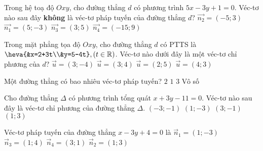 \begin{ex}%
	Trong hệ toạ độ $Oxy$, cho đường thẳng $d$ có phương trình $5x-3y+1=0$. Véc-tơ nào sau đây \textbf{không} là véc-tơ pháp tuyến của đường thẳng $d$?
	\choice
	{$\overrightarrow{n_2}=(-5;3)$}
	{$\overrightarrow{n_1}=(5;-3)$}
	{\True $\overrightarrow{n_3}=(3;5)$}
	{$\overrightarrow{n_4}=(-15;9)$}
\end{ex}


\begin{ex}%
	Trong mặt phẳng tọa độ $Oxy$, cho đường thẳng $d$ có PTTS là $\heva{&x=2+3t\\&y=5-4t},(t\in\mathbb{R})$. Véc-tơ nào dưới đây là một véc-tơ chỉ phương của $d$?
	\choice
	{\True $\overrightarrow{u}=(3;-4)$}
	{$\overrightarrow{u}=(3;4)$}
	{$\overrightarrow{u}=(2;5)$}
	{$\overrightarrow{u}=(4;3)$}
\end{ex}


\begin{ex}%
	Một đường thẳng có bao nhiêu véc-tơ pháp tuyến?
	\choice
	{$ 2 $}
	{$ 1 $}
	{$ 3 $}
	{\True Vô số}
\end{ex}


\begin{ex}%
	Cho đường thẳng $\Delta$ có phương trình tổng quát $x+3y-11=0$. Véc-tơ nào sau đây là véc-tơ chỉ phương của đường thẳng $\Delta$.
	\choice
	{$(-3;-1)$}
	{$(1;-3)$}
	{\True $(3;-1)$}
	{$(1;3)$}
\end{ex}


\begin{ex}%
	Véc-tơ pháp tuyến của đường thẳng $x-3y+4=0$ là
	\choice
	{\True $\overrightarrow{n}_1=\left(1;-3\right)$}
	{$\overrightarrow{n}_3=\left(1;4\right)$}
	{$\overrightarrow{n}_4=\left(3;1\right)$}
	{$\overrightarrow{n}_2=\left(1;3\right)$}
\end{ex}



